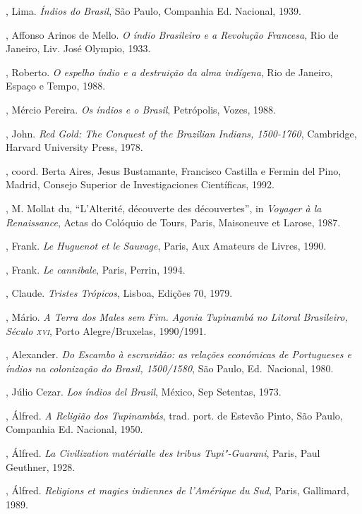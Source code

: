 \begin{bibliohedra}
, Lima. \textit{Índios do Brasil}, São Paulo, Companhia Ed.
Nacional, 1939.

, Affonso Arinos de Mello. \textit{O índio Brasileiro e a
Revolução Francesa}, Rio de Janeiro, Liv. José Olympio, 1933.

, Roberto. \textit{O espelho índio e a destruição da alma
indígena}, Rio de Janeiro, Espaço e Tempo, 1988.

, Mércio Pereira. \textit{Os índios e o Brasil}, Petrópolis, Vozes, 1988.

, John. \textit{Red Gold: The Conquest of the Brazilian
Indians, 1500-1760}, Cambridge, Harvard University Press, 1978.

, coord. Berta Aires, Jesus Bustamante, Francisco
Castilla e Fermin del Pino, Madrid, Consejo Superior de
Investigaciones Científicas, 1992.

, M. Mollat du, ``L'Alterité, découverte des découvertes'', in
\textit{Voyager à la Renaissance}, Actas do Colóquio de Tours, Paris,
Maisoneuve et Larose, 1987.

, Frank. \textit{Le Huguenot et le Sauvage}, Paris, Aux
Amateurs de Livres, 1990.

, Frank. \textit{Le cannibale}, Paris, Perrin, 1994.

, Claude. \textit{Tristes Trópicos}, Lisboa, Edições 70,
1979.

, Mário. \textit{A Terra dos Males sem Fim. Agonia Tupinambá no
Litoral Brasileiro, Século \textsc{xvi}}, Porto Alegre/Bruxelas, 1990/1991.

, Alexander. \textit{Do Escambo à escravidão: as relações
económicas de Portugueses e índios na colonização do Brasil, 1500/1580}, 
São Paulo, Ed.~Nacional, 1980.

, Júlio Cezar. \textit{Los índios del Brasil}, México, Sep
Setentas, 1973.

, Álfred. \textit{A Religião dos Tupinambás}, trad. port. de
Estevão Pinto, São Paulo, Companhia Ed. Nacional, 1950.

, Álfred. \textit{La Civilization matérialle des tribus
Tupi"-Guarani}, Paris, Paul Geuthner, 1928.

, Álfred. \textit{Religions et magies indiennes de l'Amérique
du Sud}, Paris, Gallimard, 1989.


\end{bibliohedra}
